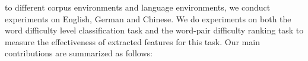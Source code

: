 to different corpus environments and language environments,
we conduct experiments on English, German and Chinese.
We do experiments on both the word difficulty level classification task and the word-pair difficulty ranking task to measure the effectiveness of extracted features for this task.
Our main contributions are summarized as follows:


